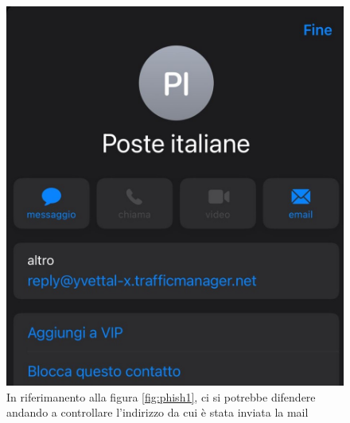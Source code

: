 \begin{figure}[!h]
  \centering
  \begin{minipage}[b]{0.5\textwidth}
    \includegraphics[width=\textwidth]{pictures/phishing3.jpg}
    \caption{In riferimanento alla figura \ref{fig:phish1}, ci si potrebbe difendere andando a controllare l'indirizzo da cui è stata inviata la mail}
    \label{fig:mailphished}
  \end{minipage}
  \hfill
\end{figure}

